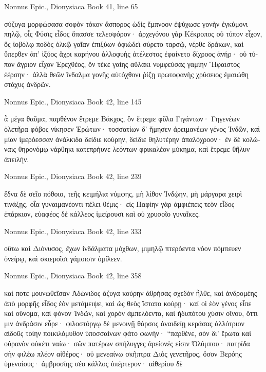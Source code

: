 \documentclass[12pt,letterpaper,twoside,final]{memoir}
\begin{document}
\begin{greek}
Nonnus Epic., Dionysiaca 
Book 41, line 65

σύζυγα μορφώσασα σοφὸν τόκον ἄσπορος ὠδὶς 
ἔμπνοον ἐψύχωσε γονὴν ἐγκύμονι πηλῷ,   
οἷς Φύσις εἶδος ὄπασσε τελεσφόρον· ἀρχεγόνου γὰρ 
Κέκροπος οὐ τύπον εἶχον, ὃς ἰοβόλῳ ποδὸς ὁλκῷ 
γαῖαν ἐπιξύων ὀφιώδεϊ σύρετο ταρσῷ, 
νέρθε δράκων, καὶ ὕπερθεν ἀπ' ἰξύος ἄχρι καρήνου 
ἀλλοφυὴς ἀτέλεστος ἐφαίνετο δίχροος ἀνήρ· 
οὐ τύπον ἄγριον εἶχον Ἐρεχθέος, ὃν τέκε γαίης 
αὔλακι νυμφεύσας γαμίην Ἥφαιστος ἐέρσην· 
ἀλλὰ θεῶν ἴνδαλμα γονῆς αὐτόχθονι ῥίζῃ 
πρωτοφανὴς χρύσειος ἐμαιώθη στάχυς ἀνδρῶν. 



Nonnus Epic., Dionysiaca 
Book 42, line 145

                                    ἆ μέγα θαῦμα, 
παρθένον ἔτρεμε Βάκχος, ὃν ἔτρεμε φῦλα Γιγάντων· 
Γηγενέων ὀλετῆρα φόβος νίκησεν Ἐρώτων· 
τοσσατίων δ' ἤμησεν ἀρειμανέων γένος Ἰνδῶν, 
καὶ μίαν ἱμερόεσσαν ἀνάλκιδα δείδιε κούρην, 
δείδιε θηλυτέρην ἁπαλόχροον· ἐν δὲ κολώναις 
θηρονόμῳ νάρθηκι κατεπρήυνε λεόντων 
φρικαλέον μύκημα, καὶ ἔτρεμε θῆλυν ἀπειλήν. 



Nonnus Epic., Dionysiaca 
Book 42, line 239

ἕδνα δὲ σεῖο πόθοιο, τεῆς κειμήλια νύμφης, 
μὴ λίθον Ἰνδῴην, μὴ μάργαρα χειρὶ τινάξῃς,   
οἷα γυναιμανέοντι πέλει θέμις· εἰς Παφίην γὰρ 
ἀμφιέπεις τεὸν εἶδος ἐπάρκιον, εὐαφέος δὲ 
κάλλεος ἱμείρουσι καὶ οὐ χρυσοῖο γυναῖκες. 



Nonnus Epic., Dionysiaca 
Book 42, line 333

οὕτω καὶ Διόνυσος, ἔχων ἰνδάλματα μόχθων, 
μιμηλῷ πτερόεντα νόον πόμπευεν ὀνείρῳ, 
καὶ σκιεροῖσι γάμοισιν ὁμίλεεν. 



Nonnus Epic., Dionysiaca 
Book 42, line 358

καί ποτε μουνωθεῖσαν Ἀδώνιδος ἄζυγα κούρην 
ἀθρήσας σχεδὸν ἦλθε, καὶ ἀνδρομέης ἀπὸ μορφῆς 
εἶδος ἑὸν μετάμειψε, καὶ ὡς θεὸς ἵστατο κούρῃ· 
καί οἱ ἑὸν γένος εἶπε καὶ οὔνομα, καὶ φόνον Ἰνδῶν, 
καὶ χορὸν ἀμπελόεντα, καὶ ἡδυπότου χύσιν οἴνου, 
ὅττι μιν ἀνδράσιν εὗρε· φιλοστόργῳ δὲ μενοινῇ 
θάρσος ἀναιδείῃ κεράσας ἀλλότριον αἰδοῦς 
τοίην ποικιλόμυθον ὑποσσαίνων φάτο φωνήν· 
 “παρθένε, σὸν δι' ἔρωτα καὶ οὐρανὸν οὐκέτι ναίω· 
σῶν πατέρων σπήλυγγες ἀρείονές εἰσιν Ὀλύμπου·   
πατρίδα σὴν φιλέω πλέον αἰθέρος· οὐ μενεαίνω 
σκῆπτρα Διὸς γενετῆρος, ὅσον Βερόης ὑμεναίους· 
ἀμβροσίης σέο κάλλος ὑπέρτερον· αἰθερίου δὲ 





\end{greek}
\end{document}
